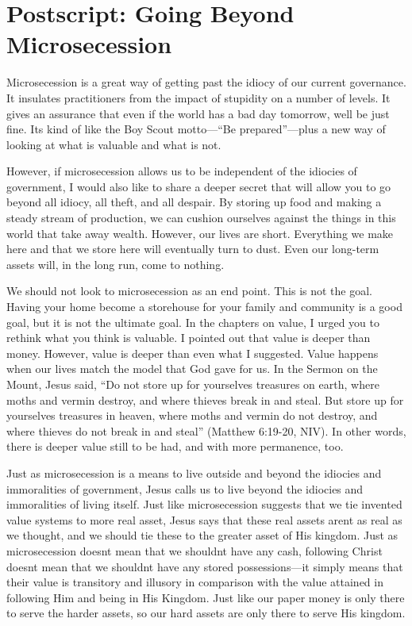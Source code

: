 \chapter*{Postscript: Going Beyond Microsecession}

Microsecession is a great way of getting past the idiocy of our current
governance. It insulates practitioners from the impact of stupidity on
a number of levels. It gives an assurance that even if the world has a
bad day tomorrow, we{\textquotesingle}ll be just fine.
It{\textquotesingle}s kind of like the Boy Scout motto—“Be
prepared”—plus a new way of looking at what is valuable and what is
not.

However, if microsecession allows us to be independent of the idiocies
of government, I would also like to share a deeper secret that
will allow you to go
beyond all idiocy, all theft, and all despair.  By storing up food and
making a steady stream of production, we can cushion ourselves against
the things in this world that take away wealth. However, our lives are
short. Everything we make here and that we store here will eventually
turn to dust. Even our long-term assets will, in the long run, come to
nothing.

We should not look to microsecession as an end point. This is not the
goal. Having your home become a storehouse for your family and
community is a good goal, but it is not the ultimate goal. In the
chapters on value, I urged you to rethink what you think is valuable. I
pointed out that value is deeper than money. However, value is deeper
than even what I suggested. Value happens when our lives match the
model that God gave for us. In the Sermon on the Mount, Jesus said, “Do
not store up for yourselves treasures on earth, where moths and vermin
destroy, and where thieves break in and steal. But store up for
yourselves treasures in heaven, where moths and vermin do not destroy,
and where thieves do not break in and steal” (Matthew 6:19-20, NIV). In
other words, there is deeper value still to be had, and with more
permanence, too.

Just as microsecession is a means to live outside and beyond the
idiocies and immoralities of government, Jesus calls us to live beyond
the idiocies and immoralities of living itself. Just like
microsecession suggests that we tie invented value systems to more real
asset, Jesus says that these real assets aren{\textquotesingle}t as
real as we thought, and we should tie these to the greater asset of His
kingdom. Just as microsecession doesn{\textquotesingle}t mean that we
shouldn{\textquotesingle}t have any cash, following Christ
doesn{\textquotesingle}t mean that we shouldn{\textquotesingle}t have
any stored possessions—it simply means that their value is transitory
and illusory in comparison with the value attained in following
Him and being in His
Kingdom. Just like our paper money is only there to serve the harder
assets, so our hard assets are only there to serve His kingdom.

